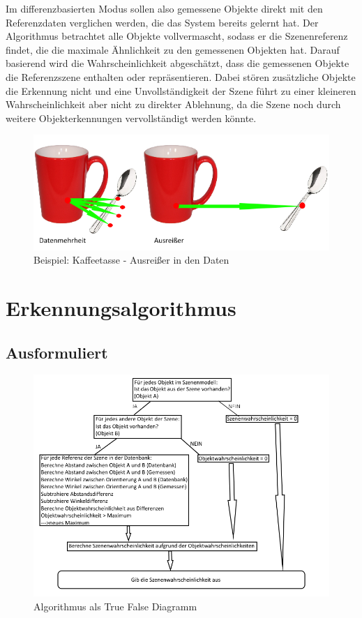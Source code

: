 Im differenzbasierten Modus sollen also gemessene Objekte direkt mit den Referenzdaten verglichen werden, die das System bereits gelernt hat. Der Algorithmus betrachtet alle Objekte vollvermascht, sodass er die Szenenreferenz findet, die die maximale Ähnlichkeit zu den gemessenen Objekten hat. Darauf basierend wird die Wahrscheinlichkeit abgeschätzt, dass die gemessenen Objekte die Referenzszene enthalten oder repräsentieren. Dabei stören zusätzliche Objekte die Erkennung nicht und eine Unvollständigkeit der Szene führt zu einer kleineren Wahrscheinlichkeit aber nicht zu direkter Ablehnung, da die Szene noch durch weitere Objekterkennungen vervollständigt werden könnte.
\begin{figure}
	\centering
	\includegraphics[width=15cm]{bilder/KonzeptAnsatz.pdf}
	\caption{Beispiel: Kaffeetasse - Ausrei\ss{}er in den Daten}
	\label{img:ausreisser}
\end{figure}
\section{Erkennungsalgorithmus}
\subsection{Ausformuliert}
\begin{figure}
	\centering
	\includegraphics[width=15cm]{bilder/AlgorithmusRoh.pdf}
	\caption{Algorithmus als True False Diagramm}
	\label{img:janein}
\end{figure}
